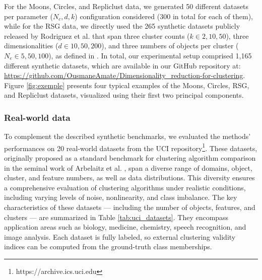 \documentclass[preprint,12pt]{elsarticle}
\begin{document}
For the Moons, Circles, and Repliclust data, we generated 50 different datasets per parameter ($N_c, d, k$) configuration considered (300 in total for each of them), while for the RSG data, we directly used the 265 synthetic datasets publicly released by Rodriguez et al. that span three cluster counts ($k \in {2, 10, 50}$), three dimensionalities ($d \in {10, 50, 200}$), and three numbers of objects per cluster ($N_e \in {5, 50, 100}$), as defined in \cite{rodriguez2019clustering}. 
In total, our experimental setup comprised %
1,165 different synthetic datasets, which are available in our GitHub repository at: \url{https://github.com/OusmaneAmate/Dimensionality_reduction-for-clustering}. Figure \ref{fig:exemple} presents four typical examples of the Moons, Circles, RSG, and Repliclust datasets, visualized using their first two principal components.



\subsubsection{Real-world data} \label{subsubsec:real_world_data}

To complement the described synthetic benchmarks, we evaluated the methods' performances on 20 real-world datasets from the UCI repository\footnote{https://archive.ics.uci.edu}. These datasets, originally proposed as a standard benchmark for clustering algorithm comparison in the seminal work of Arbelaitz et al. \cite{arbelaitz2013extensive}, span a diverse range of domains, object, cluster, and feature numbers, as well as data distributions. This diversity ensures a comprehensive evaluation of clustering algorithms under realistic conditions, including varying levels of noise, nonlinearity, and class imbalance. The key characteristics of these datasets — including the number of objects, features, and clusters — are summarized in Table \ref{tab:uci_datasets}. They encompass application areas such as biology, medicine, chemistry, speech recognition, and image analysis. Each dataset is fully labeled, so external clustering validity indices can be computed from the ground-truth class memberships.  
\end{document}
